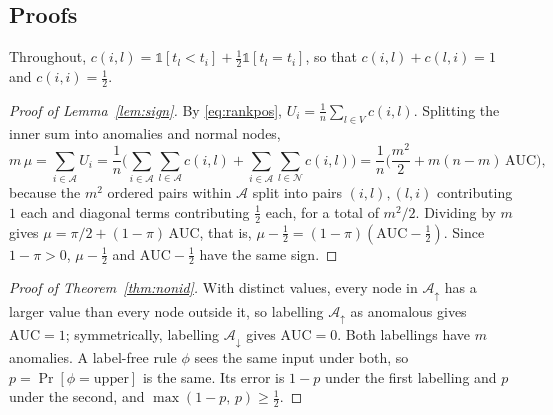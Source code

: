 \documentclass[pdflatex,sn-mathphys-ay]{sn-jnl}
\theoremstyle{plain}
\theoremstyle{remark}
\begin{document}
\begin{appendices}

\section{Proofs}\label{app:proofs}

Throughout, $c(i,l) = \mathbb{1}[t_l < t_i] + \tfrac12\mathbb{1}[t_l = t_i]$, so that $c(i,l) + c(l,i) = 1$ and $c(i,i) = \tfrac12$.

\begin{proof}[Proof of Lemma~\ref{lem:sign}]
By \eqref{eq:rankpos}, $U_i = \frac1n\sum_{l\in V} c(i,l)$. Splitting the inner sum into anomalies and normal nodes,
\[
m\,\mu = \sum_{i\in\mathcal{A}} U_i
= \frac1n\Big(\sum_{i\in\mathcal{A}}\sum_{l\in\mathcal{A}} c(i,l) + \sum_{i\in\mathcal{A}}\sum_{l\in\mathcal{N}} c(i,l)\Big)
= \frac1n\Big(\frac{m^2}{2} + m(n-m)\,\mathrm{AUC}\Big),
\]
because the $m^2$ ordered pairs within $\mathcal{A}$ split into pairs $(i,l),(l,i)$ contributing $1$ each and diagonal terms contributing $\tfrac12$ each, for a total of $m^2/2$. Dividing by $m$ gives $\mu = \pi/2 + (1-\pi)\,\mathrm{AUC}$, that is, $\mu - \tfrac12 = (1-\pi)(\mathrm{AUC} - \tfrac12)$. Since $1 - \pi > 0$, $\mu - \tfrac12$ and $\mathrm{AUC} - \tfrac12$ have the same sign.
\end{proof}

\begin{proof}[Proof of Theorem~\ref{thm:nonid}]
With distinct values, every node in $\mathcal{A}_\uparrow$ has a larger value than every node outside it, so labelling $\mathcal{A}_\uparrow$ as anomalous gives $\mathrm{AUC} = 1$; symmetrically, labelling $\mathcal{A}_\downarrow$ gives $\mathrm{AUC} = 0$. Both labellings have $m$ anomalies. A label-free rule $\phi$ sees the same input under both, so $p = \Pr[\phi = \text{upper}]$ is the same. Its error is $1 - p$ under the first labelling and $p$ under the second, and $\max(1-p,\,p) \ge \tfrac12$.
\end{proof}


\end{appendices}
\end{document}
